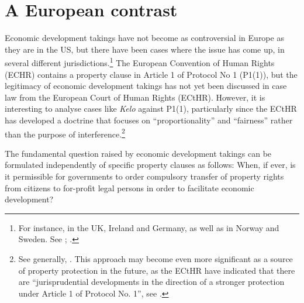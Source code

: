 \documentclass[12pt,a4paper]{book} %
\begin{document}

\section{A European contrast}\label{sec:contrast}

Economic development takings have not become as controversial in Europe as they are in the US, but there have been cases where the issue has come up, in several different jurisdictions.\footnote{For instance, in the UK, Ireland and Germany, as well as in Norway and Sweden. See \cite[466-483]{walt11}; \cite{stenseth10}.} The European Convention of Human Rights (ECHR) contains a property clause in Article 1 of Protocol No 1 (P1(1)), but the legitimacy of economic development takings has not yet been discussed in case law from the European Court of Human Rights (ECtHR). However, it is interesting to analyse cases like {\it Kelo} against P1(1), particularly since the ECtHR has developed a doctrine that focuses on ``proportionality'' and ``fairness'' rather than the purpose of interference.\footnote{See generally, \cite[Chapter 5]{allen05}. This approach may become even more significant as a source of property protection in the future, as the ECtHR have indicated that there are ``jurisprudential developments in the direction of a stronger protection under Article 1 of Protocol No. 1'', see \cite[135]{lindheim12}.}

The fundamental question raised by economic development takings can be formulated independently of specific property clauses as follows: When, if ever, is it permissible for governments to order compulsory transfer of property rights from citizens to for-profit legal persons in order to facilitate economic development?
\end{document}

